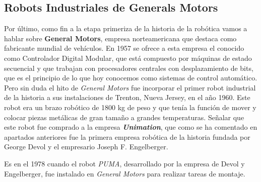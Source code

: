\subsection{Robots Industriales de Generals Motors}


Por último, como fin a la etapa primeriza de la historia de la robótica vamos a hablar sobre \textbf{General Motors}, empresa norteamericana que destaca como fabricante mundial de vehículos. En 1957 se ofrece a esta empresa el conocido como Controlador Digital Modular, que está compuesto por máquinas de estado secuencial y que trabajan con procesadores centrales con desplazamiento de bits, que es el principio de lo que hoy conocemos como sistemas de control automático.\\

Pero sin duda el hito de \textit{General Motors} fue incorporar el primer robot industrial de la historia a sus instalaciones de Trenton, Nueva Jersey, en el año 1960. Este robot era un brazo robótico de 1800 kg de peso y que tenía la función de mover y colocar piezas metálicas de gran tamaño a grandes temperaturas. Señalar que este robot fue comprado a la empresa \textit{\textbf{Unimation}}, que como se ha comentado en apartados anteriores fue la primera empresa robótica de la historia fundada por  George Devol y el empresario  Joseph F. Engelberger.

Es en el 1978 cuando el robot \textit{PUMA}, desarrollado por la empresa de Devol y Engelberger, fue instalado en \textit{General Motors} para realizar tareas de montaje.




